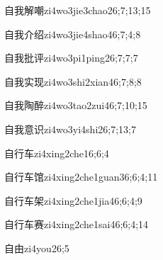 \begin{verbete}{自我解嘲}{zi4wo3jie3chao2}{6;7;13;15}
\end{verbete}

\begin{verbete}{自我介绍}{zi4wo3jie4shao4}{6;7;4;8}
\end{verbete}

\begin{verbete}{自我批评}{zi4wo3pi1ping2}{6;7;7;7}
\end{verbete}

\begin{verbete}{自我实现}{zi4wo3shi2xian4}{6;7;8;8}
\end{verbete}

\begin{verbete}{自我陶醉}{zi4wo3tao2zui4}{6;7;10;15}
\end{verbete}

\begin{verbete}{自我意识}{zi4wo3yi4shi2}{6;7;13;7}
\end{verbete}

\begin{verbete}{自行车}{zi4xing2che1}{6;6;4}
\end{verbete}

\begin{verbete}{自行车馆}{zi4xing2che1guan3}{6;6;4;11}
\end{verbete}

\begin{verbete}{自行车架}{zi4xing2che1jia4}{6;6;4;9}
\end{verbete}

\begin{verbete}{自行车赛}{zi4xing2che1sai4}{6;6;4;14}
\end{verbete}

\begin{verbete}{自由}{zi4you2}{6;5}
\end{verbete}

